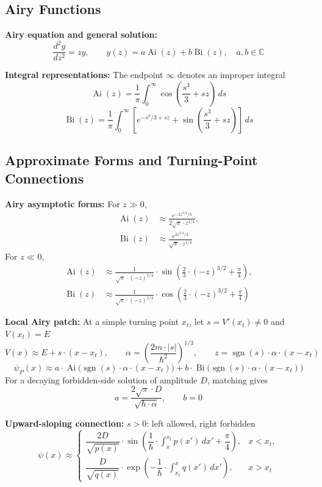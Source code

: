 \documentclass[12pt]{article}
\begin{document}
\subsection{Airy Functions}

\textbf{Airy equation and general solution:}
\[
  \frac{d^2y}{dz^2}=zy,\qquad
  y(z)=a\operatorname{Ai}(z)+b\operatorname{Bi}(z),\quad a,b\in\mathbb C
\]

\textbf{Integral representations:}
The endpoint $\infty$ denotes an improper integral
\[
  \operatorname{Ai}(z)=\frac1\pi\int_0^\infty
    \cos\left(\frac{s^3}{3}+sz\right)\,ds
\]
\[
  \operatorname{Bi}(z)=\frac1\pi\int_0^\infty
    \left[e^{-s^3/3+sz}+\sin\left(\frac{s^3}{3}+sz\right)\right]\,ds
\]

\subsection{Approximate Forms and Turning-Point Connections}

\textbf{Airy asymptotic forms:}
For $z\gg0$,
\[
  \begin{aligned}
    \operatorname{Ai}(z)&\approx\frac{e^{-2z^{3/2}/3}}{2\sqrt\pi\cdot z^{1/4}},\\
    \operatorname{Bi}(z)&\approx\frac{e^{2z^{3/2}/3}}{\sqrt\pi\cdot z^{1/4}}
  \end{aligned}
\]
For $z\ll0$,
\[
  \begin{aligned}
    \operatorname{Ai}(z)&\approx\frac1{\sqrt\pi\cdot(-z)^{1/4}}\cdot
      \sin\left(\frac23\cdot(-z)^{3/2}+\frac\pi4\right),\\
    \operatorname{Bi}(z)&\approx\frac1{\sqrt\pi\cdot(-z)^{1/4}}\cdot
      \cos\left(\frac23\cdot(-z)^{3/2}+\frac\pi4\right)
  \end{aligned}
\]

\textbf{Local Airy patch:}
At a simple turning point $x_t$, let $s=V'(x_t)\ne0$ and $V(x_t)=E$
\[
  V(x)\approx E+s\cdot(x-x_t),\qquad
  \alpha=\left(\frac{2m\cdot|s|}{\hbar^2}\right)^{1/3},\qquad
  z=\operatorname{sgn}(s)\cdot\alpha\cdot(x-x_t)
\]
\[
  \psi_P(x)\approx
    a\cdot\operatorname{Ai}\bigl(\operatorname{sgn}(s)\cdot\alpha\cdot(x-x_t)\bigr)
    +b\cdot\operatorname{Bi}\bigl(\operatorname{sgn}(s)\cdot\alpha\cdot(x-x_t)\bigr)
\]
For a decaying forbidden-side solution of amplitude $D$, matching gives
\[
  a=\frac{2\sqrt\pi\cdot D}{\sqrt{\hbar\cdot\alpha}},\qquad b=0
\]

\textbf{Upward-sloping connection:}
$s>0$: left allowed, right forbidden
\[
  \psi(x)\approx\begin{cases}
    \dfrac{2D}{\sqrt{p(x)}}\cdot\sin\left(
      \dfrac1\hbar\cdot\int_{x}^{x_t}p(x')\,dx'
      +\dfrac\pi4\right),&x<x_t,\\[1em]
    \dfrac{D}{\sqrt{q(x)}}\cdot\exp\left(
      -\dfrac1\hbar\cdot\int_{x_t}^{x}q(x')\,dx'\right),&x>x_t
  \end{cases}
\]
\end{document}
